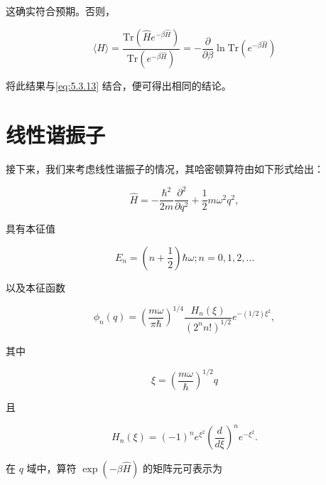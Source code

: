 这确实符合预期。否则，

\begin{equation}\tag{5.3.16}\label{eq:5.3.16}
\langle H \rangle = \frac { \mathrm { T r } ( \hat { H } e ^{- \beta \hat { H} } ) } { \mathrm { T r } ( e ^{- \beta \hat { H} } ) } = - \frac { \partial } { \partial \beta } \ln \mathrm { T r } ( e ^{- \beta \hat { H} } )
\end{equation}

将此结果与\autoref{eq:5.3.13} 结合，便可得出相同的结论。

\section{线性谐振子}\label{c-ux7ebfux6027ux8c10ux632fux5b50}

接下来，我们来考虑线性谐振子的情况，其哈密顿算符由如下形式给出：

\begin{equation}\tag{5.3.17}\label{eq:5.3.17}
\hat { H } = - \frac { \hbar ^{2} } { 2 m } \frac { \partial ^{2} } { \partial q ^{2} } + \frac { 1 } { 2 } m \omega ^{2} q ^{2} ,
\end{equation}

具有本征值

\begin{equation}\tag{5.3.18}\label{eq:5.3.18}
E _ { n } = \left( n + \frac { 1 } { 2 } \right) \hbar \omega ;  n = 0 , 1 , 2 , \ldots
\end{equation}

以及本征函数

\begin{equation}\tag{5.3.19}\label{eq:5.3.19}
\phi _ { n } ( q ) = \left( \frac { m \omega } { \pi \hbar } \right) ^{1 / 4} \frac { H _ { n } ( \xi ) } { ( 2 ^{n} n ! ) ^{1 / 2} } e ^{- ( 1 / 2 ) \xi ^ { 2} } ,
\end{equation}

其中

\begin{equation}\tag{5.3.20}\label{eq:5.3.20}
\xi = \left( \frac { m \omega } { \hbar } \right) ^{1 / 2} q
\end{equation}

且

\begin{equation}\tag{5.3.21}\label{eq:5.3.21}
H _ { n } ( \xi ) = ( - 1 ) ^{n} e ^{\xi ^ { 2} } \left( \frac { d } { d \xi } \right) ^{n} e ^{- \xi ^ { 2} } .
\end{equation}

在 \(q\) 域中，算符 \(\exp(-\beta\hat{H})\) 的矩阵元可表示为

